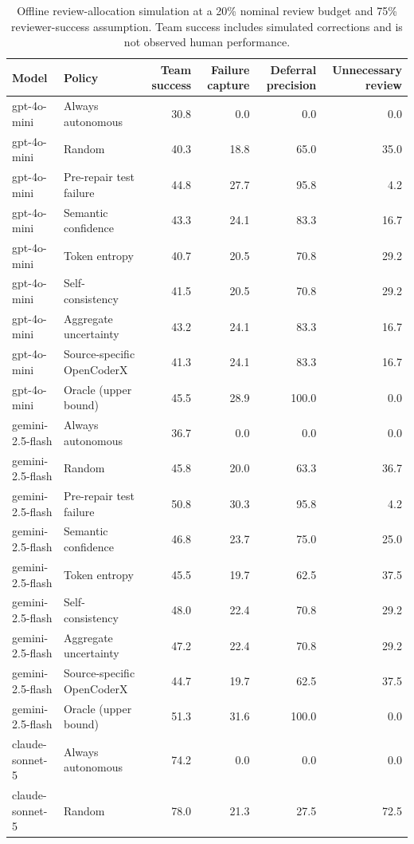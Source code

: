 \begin{table}[t]
\centering
\scriptsize
\caption{Offline review-allocation simulation at a 20\% nominal review budget and 75\% reviewer-success assumption. Team success includes simulated corrections and is not observed human performance.}
\label{tab:review_allocation}
\begin{tabular}{llrrrr}
\toprule
Model & Policy & Team success & Failure capture & Deferral precision & Unnecessary review \\
\midrule
gpt-4o-mini & Always autonomous & 30.8 & 0.0 & 0.0 & 0.0 \\
gpt-4o-mini & Random & 40.3 & 18.8 & 65.0 & 35.0 \\
gpt-4o-mini & Pre-repair test failure & 44.8 & 27.7 & 95.8 & 4.2 \\
gpt-4o-mini & Semantic confidence & 43.3 & 24.1 & 83.3 & 16.7 \\
gpt-4o-mini & Token entropy & 40.7 & 20.5 & 70.8 & 29.2 \\
gpt-4o-mini & Self-consistency & 41.5 & 20.5 & 70.8 & 29.2 \\
gpt-4o-mini & Aggregate uncertainty & 43.2 & 24.1 & 83.3 & 16.7 \\
gpt-4o-mini & Source-specific OpenCoderX & 41.3 & 24.1 & 83.3 & 16.7 \\
gpt-4o-mini & Oracle (upper bound) & 45.5 & 28.9 & 100.0 & 0.0 \\
\midrule
gemini-2.5-flash & Always autonomous & 36.7 & 0.0 & 0.0 & 0.0 \\
gemini-2.5-flash & Random & 45.8 & 20.0 & 63.3 & 36.7 \\
gemini-2.5-flash & Pre-repair test failure & 50.8 & 30.3 & 95.8 & 4.2 \\
gemini-2.5-flash & Semantic confidence & 46.8 & 23.7 & 75.0 & 25.0 \\
gemini-2.5-flash & Token entropy & 45.5 & 19.7 & 62.5 & 37.5 \\
gemini-2.5-flash & Self-consistency & 48.0 & 22.4 & 70.8 & 29.2 \\
gemini-2.5-flash & Aggregate uncertainty & 47.2 & 22.4 & 70.8 & 29.2 \\
gemini-2.5-flash & Source-specific OpenCoderX & 44.7 & 19.7 & 62.5 & 37.5 \\
gemini-2.5-flash & Oracle (upper bound) & 51.3 & 31.6 & 100.0 & 0.0 \\
\midrule
claude-sonnet-5 & Always autonomous & 74.2 & 0.0 & 0.0 & 0.0 \\
claude-sonnet-5 & Random & 78.0 & 21.3 & 27.5 & 72.5 \\

\end{tabular}
\end{table}
